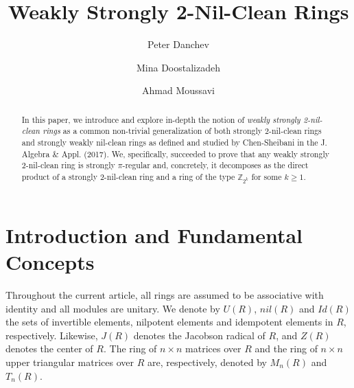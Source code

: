 \documentclass[12pt]{amsart}
\theoremstyle{definition}
\begin{document}
\author[P. Danchev]{Peter Danchev}
\address{Institute of Mathematics and Informatics, Bulgarian Academy of Sciences, 1113 Sofia, Bulgaria}
	
\author[M. Doostalizadeh]{Mina Doostalizadeh}
\address{Department of Mathematics, Tarbiat Modares University, 14115-111 Tehran Jalal AleAhmad Nasr, Iran}

\author[A. Moussavi]{Ahmad Moussavi}
\address{Department of Mathematics, Tarbiat Modares University, 14115-111 Tehran Jalal AleAhmad Nasr, Iran}

\title[Weakly Strongly 2-Nil-Clean Rings]{Weakly Strongly 2-Nil-Clean Rings}

\maketitle




\begin{abstract}
In this paper, we introduce and explore in-depth the notion of {\it weakly strongly 2-nil-clean rings} as a common non-trivial generalization of both strongly 2-nil-clean rings and strongly weakly nil-clean rings as defined and studied by Chen-Sheibani in the J. Algebra \& Appl. (2017). We, specifically, succeeded to prove that any weakly strongly 2-nil-clean ring is strongly $\pi$-regular and, concretely, it decomposes as the direct product of a strongly 2-nil-clean ring and a ring of the type $\mathbb{Z}_{2^k}$ for some $k\geq 1$.
\end{abstract}

\section{Introduction and Fundamental Concepts}

Throughout the current article, all rings are assumed to be associative with identity and all modules are unitary. We denote by $U(R)$, $nil(R)$ and $Id(R)$ the sets of invertible elements, nilpotent elements and idempotent elements in $R$, respectively. Likewise, $J(R)$ denotes the Jacobson radical of $R$, and $Z(R)$ denotes the center of $R$. The ring of $n\times n$ matrices over $R$ and the ring of $n\times n$ upper triangular matrices over $R$ are, respectively, denoted by $M_{n}(R)$ and $T_{n}(R)$.
\end{document}

